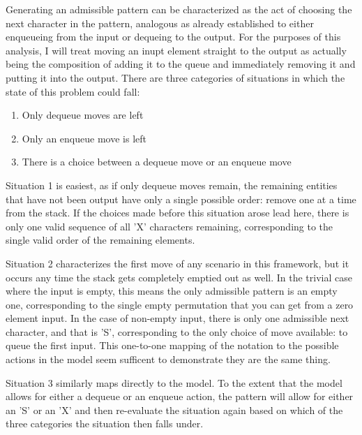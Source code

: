 \documentclass{article}
\begin{document}
Generating an admissible pattern can be characterized as the act of choosing the next character in the pattern, analogous as already established to either enqueueing from the input or dequeing to the output.  For the purposes of this analysis, I will treat moving an inupt element straight to the output as actually being the composition of adding it to the queue and immediately removing it and putting it into the output.  There are three categories of situations in which the state of this problem could fall:
\begin{enumerate}
  \item Only dequeue moves are left
  \item Only an enqueue move is left
  \item There is a choice between a dequeue move or an enqueue move
\end{enumerate}

Situation 1 is easiest, as if only dequeue moves remain, the remaining entities that have not been output have only a single possible order: remove one at a time from the stack.  If the choices made before this situation arose lead here, there is only one valid sequence of all 'X' characters remaining, corresponding to the single valid order of the remaining elements.

\par

Situation 2 characterizes the first move of any scenario in this framework, but it occurs any time the stack gets completely emptied out as well.  In the trivial case where the input is empty, this means the only admissible pattern is an empty one, corresponding to the single empty permutation that you can get from a zero element input.  In the case of non-empty input, there is only one admissible next character, and that is 'S', corresponding to the only choice of move available: to queue the first input.  This one-to-one mapping of the notation to the possible actions in the model seem sufficent to demonstrate they are the same thing.

\par

Situation 3 similarly maps directly to the model.  To the extent that the model allows for either a dequeue or an enqueue action, the pattern will allow for either an 'S' or an 'X' and then re-evaluate the situation again based on which of the three categories the situation then falls under.

\par
\end{document}
